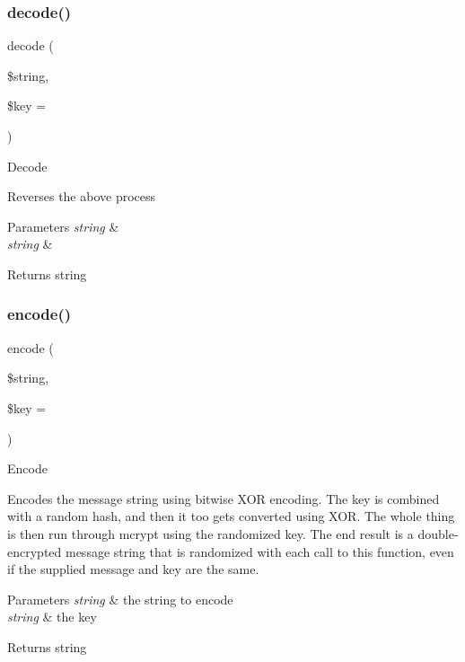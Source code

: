 \subsubsection{\texorpdfstring{decode()}{decode()}}
{\footnotesize\ttfamily decode (\begin{DoxyParamCaption}\item[{}]{\$string,  }\item[{}]{\$key = {\ttfamily \textquotesingle{}\textquotesingle{}} }\end{DoxyParamCaption})}

Decode

Reverses the above process


\begin{DoxyParams}{Parameters}
{\em string} & \\
\hline
{\em string} & \\
\hline
\end{DoxyParams}
\begin{DoxyReturn}{Returns}
string 
\end{DoxyReturn}
\mbox{\label{class_c_i___encrypt_a6320fc999db614bc009690cc4867e238}} 
\subsubsection{\texorpdfstring{encode()}{encode()}}
{\footnotesize\ttfamily encode (\begin{DoxyParamCaption}\item[{}]{\$string,  }\item[{}]{\$key = {\ttfamily \textquotesingle{}\textquotesingle{}} }\end{DoxyParamCaption})}

Encode

Encodes the message string using bitwise X\+OR encoding. The key is combined with a random hash, and then it too gets converted using X\+OR. The whole thing is then run through mcrypt using the randomized key. The end result is a double-\/encrypted message string that is randomized with each call to this function, even if the supplied message and key are the same.


\begin{DoxyParams}{Parameters}
{\em string} & the string to encode \\
\hline
{\em string} & the key \\
\hline
\end{DoxyParams}
\begin{DoxyReturn}{Returns}
string 
\end{DoxyReturn}
\mbox{\label{class_c_i___encrypt_a74e58407a40ff1f3d030a2065cf10182}} 
